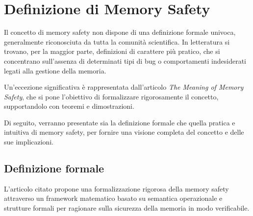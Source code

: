 \section{Definizione di Memory Safety}
\label{sec:memory_safety}

Il concetto di memory safety non dispone di una definizione formale univoca,
generalmente riconosciuta da tutta la comunità scientifica. In letteratura si trovano,
per la maggior parte, definizioni di carattere più pratico, che si concentrano
sull'assenza di determinati tipi di bug o comportamenti indesiderati legati alla
gestione della memoria.

Un'eccezione significativa è rappresentata dall'articolo \textit{The Meaning of
Memory Safety}\cite{meaning_memory_safety}, che si pone l'obiettivo di formalizzare
rigorosamente il concetto, supportandolo con teoremi e dimostrazioni.

\vspace{0.5em}
Di seguito, verranno presentate sia la definizione formale che quella pratica e intuitiva
di memory safety, per fornire una visione completa del concetto e delle sue
implicazioni.

\subsection{Definizione formale}
\label{sec:formal_definition}

L'articolo citato\cite{meaning_memory_safety} propone una formalizzazione
rigorosa della memory safety attraverso un framework matematico basato su
semantica operazionale e strutture formali per ragionare sulla sicurezza della
memoria in modo verificabile.

